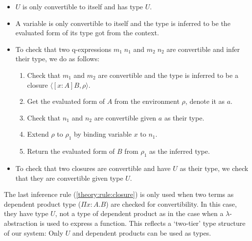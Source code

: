 \begin{itemize}
\item $U$ is only convertible to itself and has type $U$.
\item A variable is only convertible to itself and the type is inferred to be the evaluated form of its type got from the context.
\item To check that two q-expressions $m_1 \; n_1$ and $m_2 \; n_2$ are convertible and infer their type, we do as follows:
  \begin{enumerate}
  \item Check that $m_1$ and $m_2$ are convertible and the type is inferred to be a closure $\langle [x : A] B, \rho \rangle$.
  \item Get the evaluated form of $A$ from the environment $\rho$, denote it as $a$.
  \item Check that $n_1$ and $n_2$ are convertible given $a$ as their type.
  \item Extend $\rho$ to $\rho_1$ by binding variable $x$ to $n_1$. 
  \item Return the evaluated form of $B$ from $\rho_1$ as the inferred type.
  \end{enumerate}
\item To check that two closures are convertible and have $U$ as their type, we check that they are convertible given type $U$. 
\end{itemize}
The last inference rule (\ref{theory:rule:closure}) is only used when two terms as dependent product type ($\Pi x:A.B$) are checked for convertibility. In this case, they have type $U$, not a type of dependent product as in the case when a $\lambda$-abstraction is used to express a function. This reflects a `two-tier' type structure of our system: Only $U$ and dependent products can be used as types.

